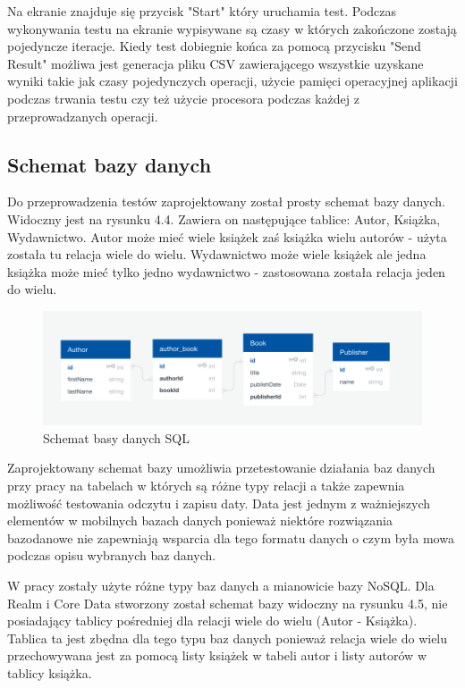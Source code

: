 \newpage

Na ekranie znajduje się przycisk "Start" który uruchamia test. Podczas wykonywania testu na ekranie wypisywane są czasy w których zakończone zostają pojedyncze iteracje. Kiedy test dobiegnie końca za pomocą przycisku "Send Result" możliwa jest generacja pliku CSV zawierającego wszystkie uzyskane wyniki takie jak czasy pojedynczych operacji, użycie pamięci operacyjnej aplikacji podczas trwania testu czy też użycie procesora podczas każdej z przeprowadzanych operacji. 

\subsection{Schemat bazy danych}

Do przeprowadzenia testów zaprojektowany został prosty schemat bazy danych. Widoczny jest na rysunku 4.4. Zawiera on następujące tablice: Autor, Książka, Wydawnictwo. Autor może mieć wiele książek zaś książka wielu autorów - użyta została tu relacja wiele do wielu. Wydawnictwo może wiele książek ale jedna książka może mieć tylko jedno wydawnictwo - zastosowana została relacja jeden do wielu. 

\begin{figure}[h]
\centering
	\includegraphics[width=\linewidth]{img/database/sql-scheme.png}
	\caption{Schemat basy danych SQL}
	\label{fig: sql_data_schame}
\end{figure}

Zaprojektowany schemat bazy umożliwia przetestowanie działania baz danych przy pracy na tabelach w których są różne typy relacji a także zapewnia możliwość testowania odczytu i zapisu daty. Data jest jednym z ważniejszych elementów w mobilnych bazach danych ponieważ niektóre rozwiązania bazodanowe nie zapewniają wsparcia dla tego formatu danych o czym była mowa podczas opisu wybranych baz danych. \par 

W pracy zostały użyte różne typy baz danych a mianowicie bazy NoSQL. Dla Realm i Core Data stworzony został schemat bazy widoczny na rysunku 4.5, nie posiadający tablicy pośredniej dla relacji wiele do wielu (Autor - Książka). Tablica ta jest zbędna dla tego typu baz danych ponieważ relacja wiele do wielu przechowywana jest za pomocą listy książek w tabeli autor i listy autorów w tablicy książka. 

